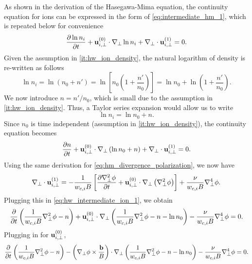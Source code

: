 \documentclass[11pt]{article}
\begin{document}
As shown in the derivation of the Hasegawa-Mima equation, the continuity equation for ions can be expressed in the form of \cref{eq:intermediate_hm_1}, which is repeated below for convenience
\begin{equation}
    \frac{\partial \ln n_i}{\partial t} + \mathbf{u}^{(0)}_{i,\perp} \cdot \nabla_\perp \ln n_i + \nabla_\perp \cdot \mathbf{u}^{(1)}_{i,\perp} = 0.
\end{equation}
Given the assumption in \cref{it:hw_ion_density}, the natural logarithm of density is re-written as follows
\begin{equation}
    \ln n_i = \ln \left ( n_0 + n' \right ) = \ln \left [ n_0 \left ( 1 + \frac{n'}{n_0} \right ) \right ] = \ln n_0 + \ln \left (1 + \frac{n'}{n_0} \right ).
\end{equation}
We now introduce $n = n' / n_0$, which is small due to the assumption in \cref{it:hw_ion_density}. Thus, a Taylor series expansion would allow us to write
\begin{equation}
    \label{eq:hw_ion_density}
    \ln n_i = \ln n_0 + n.
\end{equation}
Since $n_0$ is time independent (assumption in \cref{it:hw_ion_density}), the continuity equation becomes
\begin{equation}
    \label{eq:hw_intermediate_ion_1}
    \frac{\partial n}{\partial t} + \mathbf{u}^{(0)}_{i,\perp} \cdot \nabla_\perp \left ( \ln n_0 + n \right ) + \nabla_\perp \cdot \mathbf{u}^{(1)}_{i,\perp} = 0.
\end{equation}
Using the same derivation for \cref{eq:hm_divergence_polarization}, we now have
\begin{equation}
    \nabla_\perp \cdot \mathbf{u}_{i,\perp}^{(1)} = -\frac{1}{w_{c,i} B} \left [ \frac{\partial \nabla_\perp^2 \phi}{\partial t} + \mathbf{u}_{i,\perp}^{(0)} \cdot \nabla_\perp \left ( \nabla_\perp^2 \phi \right ) \right ] + \frac{\nu}{w_{c,i} B} \nabla^4_\perp \phi.
\end{equation}
Plugging this in \cref{eq:hw_intermediate_ion_1}, we obtain
\begin{equation}
    \frac{\partial}{\partial t} \left ( \frac{1}{w_{c,i} B} \nabla^2_\perp \phi - n \right ) + \mathbf{u}^{(0)}_{i,\perp} \cdot \nabla_\perp \left ( \frac{1}{w_{c,i} B} \nabla^2_\perp \phi - n - \ln n_0 \right ) - \frac{\nu}{w_{c,i} B} \nabla^4_\perp \phi = 0.
\end{equation}
Plugging in for $\mathbf{u}^{(0)}_{i,\perp}$,
\begin{equation}
    \label{eq:hw_ion_continuity}
    \frac{\partial}{\partial t} \left ( \frac{1}{w_{c,i} B} \nabla^2_\perp \phi - n \right ) - \left (\nabla_\perp \phi \times \frac{\mathbf{b}}{B} \right ) \cdot \nabla_\perp \left ( \frac{1}{w_{c,i} B} \nabla^2_\perp \phi - n - \ln n_0 \right ) - \frac{\nu}{w_{c,i} B} \nabla^4_\perp \phi = 0.
\end{equation}
\end{document}
